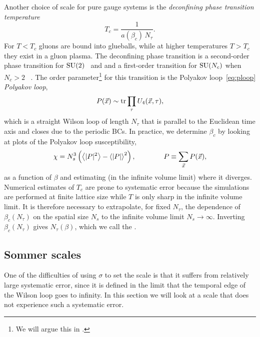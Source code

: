 Another choice of scale for pure gauge systems is the 
{\it deconfining phase transition temperature}
\begin{equation}
  T_c=\frac{1}{a(\beta_c)\,N_\tau}.
\end{equation}
For $T<T_c$ gluons are bound into  glueballs, while 
at higher temperatures $T>T_c$ they exist in a gluon plasma. 
The deconfining phase transition is a second-order phase transition for 
$\operatorname{SU}(2)$~\cite{engels_critical_1996} and
and a first-order transition for $\operatorname{SU}(N_c)$ when $N_c>2$
~\cite{svetitsky_critical_1982}. 
The order parameter\footnote{We will argue this in .} 
for this transition is the 
Polyakov loop~\eqref{eq:ploop}
 {\it Polyakov loop}, 
\begin{equation}\label{eq:ploop}
  P(\vec{x})\sim\tr\prod_\tau U_4(\vec{x},\tau),
\end{equation}
which is a straight Wilson loop of length $N_\tau$ that is 
parallel to the Euclidean time 
axis and closes due to the periodic BCs. 
In practice, 
we determine $\beta_c$ by looking at plots of the Polyakov loop 
susceptibility,
\begin{equation}
  \chi=N_s^3\left(\ev{|P|^2}-\ev{|P|}^2\right), \qquad\qquad 
    P\equiv\sum\limits_{\vec{x}}P(\vec{x}),
\end{equation}
as a function of $\beta$ and estimating (in the infinite volume limit)
where it diverges. Numerical estimates
of $T_c$ are prone to systematic error because the simulations are
performed at finite lattice size while $T$ is only sharp in the infinite
volume limit. It is therefore necessary to extrapolate, for fixed $N_{\tau}$,
the dependence of $\beta_c(N_\tau)$ on the spatial size $N_s$ to the
infinite volume limit $N_s\to\infty$. Inverting $\beta_c(N_\tau)$ gives
$N_\tau(\beta)$, which we call the
.


\subsection{Sommer scales}

One of the difficulties of using $\sigma$ to set the scale is that it suffers
from relatively large systematic error, since it is defined in the limit that
the temporal edge of the Wilson loop goes to infinity.
In this section we will look at a scale that does not experience such a
systematic error.


